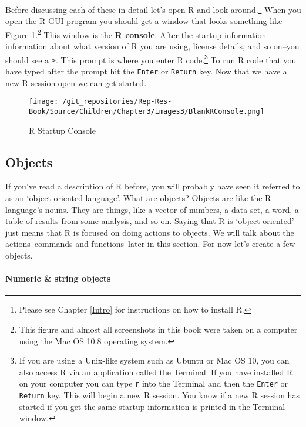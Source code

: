 Before discussing each of these in detail let's open R and look around.\footnote{Please see Chapter \ref{Intro} for instructions on how to install R.} When you open the R GUI program you should get a window that looks something like Figure \ref{RBlankMain}.\footnote{This figure and almost all screenshots in this book were taken on a computer using the Mac OS 10.8 operating system.} This window is the {\bf{R console}}. After the startup information--information about what version of R you are using, license details, and so on--you should see a {\tt{\textgreater}}. This prompt is where you enter R code.\footnote{If you are using a Unix-like system such as Ubuntu or Mac OS 10, you can also access R via an application called the Terminal. If you have installed R on your computer you can type {\tt{r}} into the Terminal and then the {\tt{Enter}} or {\tt{Return}} key. This will begin a new R session. You know if a new R session has started if you get the same startup information is printed in the Terminal window.} To run R code that you have typed after the prompt hit the {\tt{Enter}} or {\tt{Return}} key. Now that we have a new R session open we can get started. 

\begin{figure}[th!]
    \caption{R Startup Console}
    \label{RBlankMain}
    \begin{center}
    \texttt{[image: /git\_repositories/Rep-Res-Book/Source/Children/Chapter3/images3/BlankRConsole.png]}
    \end{center}
\end{figure}

\subsection{Objects}\label{Objects}

If you've read a description of R before, you will probably have seen it referred to as an `object-oriented language'.  What are objects? Objects are like the R language's nouns. They are things, like a vector of numbers, a data set, a word, a table of results from some analysis, and so on. Saying that R is `object-oriented' just means that R is focused on doing actions to objects. We will talk about the actions--commands and functions--later in this section. For now let's create a few objects.

\paragraph{Numeric \& string objects}

